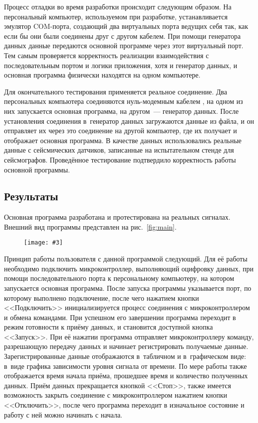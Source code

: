 \documentclass[a4paper, 14pt, titlepage]{extarticle}
\newenvironment{myfigure}[2]%
    {\pushQED{\caption{#1} \label{#2}} %
     \begin{figure}[!htb]\centering } %
    {  \popQED %
     \end{figure}}
\newcommand{\includefigure}[3][]{
    \begin{myfigure}{#2}{fig:#3}
      \texttt{[image: \#3]}
    \end{myfigure}
  }
\begin{document}
  Процесс отладки во время разработки происходит следующим образом. На персональный компьютер,
  используемом при разработке, устанавливается эмулятор COM-порта, создающий два виртуальных порта
  ведущих себя так, как если бы они были соединены друг с другом кабелем. При помощи генератора
  данных данные передаются основной программе через этот виртуальный порт. Тем самым проверяется
  корректность реализации взаимодействия с последовательным портом и логики приложения, хотя и
  генератор данных, и основная программа физически находятся на одном компьютере.

  Для окончательного тестирования применяется реальное соединение. Два персональных компьютера
  соединяются нуль-модемным кабелем \cite{null-modem}, на одном из них запускается основная
  программа, на другом~--- генератор данных. После установления соединения в~генератор данных
  загружаются данные из файла, и он отправляет их через это соединение на другой компьютер, где их
  получает и отображает основная программа. В качестве данных использовались реальные данные с
  сейсмических датчиков, записанные на испытательном стенде для сейсмографов. Проведённое
  тестирование подтвердило корректность работы основной программы.

  \subsection{Результаты}

  Основная программа разработана и протестирована на реальных сигналах. Внешний вид программы
  представлен на рис.~\ref{fig:main}.
  \includefigure[width=0.7\textwidth]{основная программа}{main}

  Принцип работы пользователя с данной программой следующий. Для её работы необходимо подключить
  микроконтроллер, выполняющий оцифровку данных, при помощи последовательного порта к персональному
  компьютеру, на котором запускается основная программа. После запуска программы указывается порт,
  по которому выполнено подключение, после чего нажатием кнопки <<Подключить>> инициализируется
  процесс соединения с микроконтроллером и обмена командами. При успешном его завершении программа
  переходит в режим готовности к приёму данных, и становится доступной кнопка <<Запуск>>. При её нажатии
  программа отправляет микроконтроллеру команду, разрешающую передачу данных и начинает
  регистрировать получаемые данные. Зарегистрированные данные отображаются в~табличном и
  в~графическом виде: в~виде графика зависимости уровня сигнала от времени. По мере работы также
  отображается время начала приёма, прошедшее время и количество полученных данных. Приём данных
  прекращается кнопкой <<Стоп>>, также имеется возможность закрыть соединение с микроконтроллером
  нажатием кнопки <<Отключить>>, после чего программа переходит в изначальное состояние и работу с
  ней можно начинать с начала.
\end{document}
